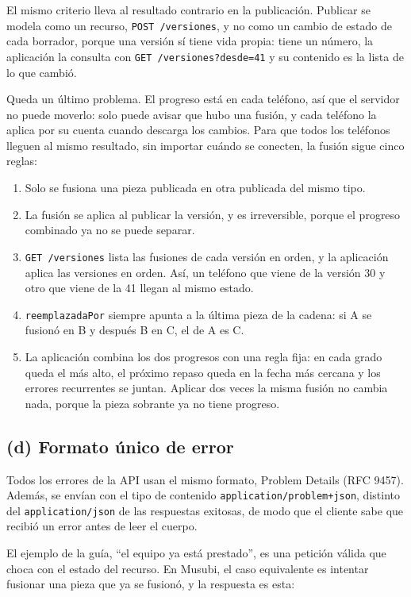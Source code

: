 \documentclass[11pt]{article}
\begin{document}
El mismo criterio lleva al resultado contrario en la publicación. Publicar se modela como un recurso, \texttt{POST /versiones}, y no como un cambio de estado de cada borrador, porque una versión sí tiene vida propia: tiene un número, la aplicación la consulta con \texttt{GET /versiones?desde=41} y su contenido es la lista de lo que cambió.

Queda un último problema. El progreso está en cada teléfono, así que el servidor no puede moverlo: solo puede avisar que hubo una fusión, y cada teléfono la aplica por su cuenta cuando descarga los cambios. Para que todos los teléfonos lleguen al mismo resultado, sin importar cuándo se conecten, la fusión sigue cinco reglas:

\begin{enumerate}
  \item Solo se fusiona una pieza publicada en otra publicada del mismo tipo.
  \item La fusión se aplica al publicar la versión, y es irreversible, porque el progreso combinado ya no se puede separar.
  \item \texttt{GET /versiones} lista las fusiones de cada versión en orden, y la aplicación aplica las versiones en orden. Así, un teléfono que viene de la versión 30 y otro que viene de la 41 llegan al mismo estado.
  \item \texttt{reemplazadaPor} siempre apunta a la última pieza de la cadena: si A se fusionó en B y después B en C, el de A es C.
  \item La aplicación combina los dos progresos con una regla fija: en cada grado queda el más alto, el próximo repaso queda en la fecha más cercana y los errores recurrentes se juntan. Aplicar dos veces la misma fusión no cambia nada, porque la pieza sobrante ya no tiene progreso.
\end{enumerate}

\subsection*{(d) Formato único de error}

Todos los errores de la API usan el mismo formato, Problem Details (RFC 9457). Además, se envían con el tipo de contenido \texttt{application/problem+json}, distinto del \texttt{application/json} de las respuestas exitosas, de modo que el cliente sabe que recibió un error antes de leer el cuerpo.

El ejemplo de la guía, ``el equipo ya está prestado'', es una petición válida que choca con el estado del recurso. En Musubi, el caso equivalente es intentar fusionar una pieza que ya se fusionó, y la respuesta es esta:
\end{document}
